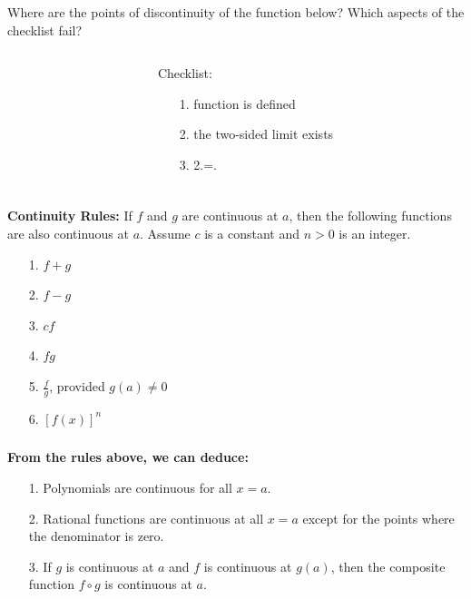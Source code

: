 \documentclass[14pt]{beamer}
\begin{document}
\begin{frame}
\small
Where are the points of discontinuity of the function below?  Which aspects of the checklist fail?
\begin{columns}[T]
	\begin{column}{.45\textwidth}
		\begin{block}
		\end{block}
	\end{column}
	\begin{column}{.45\textwidth}
		\begin{block}
		{Checklist:}
			\begin{itemize}
			\item[1.] function is defined
			\item[2.] the two-sided limit exists
			\item[3.] 2.\;=\;1.
			\end{itemize}
		\end{block}
	\end{column}
\end{columns}
\end{frame}

\begin{frame}
\frametitle{}
\small
{\bf Continuity Rules:}  If $f$ and $g$ are continuous at $a$, then the following functions are also continuous at $a$.  Assume $c$ is a constant and $n>0$ is an integer.

\begin{itemize}
\item[1.] $f+g$
\item[2.] $f-g$
\item[3.] $cf$
\item[4.] $fg$
\item[5.] $\frac{f}{g}$, provided $g(a)\ne 0$
\item[6.] $[f(x)]^n$
\end{itemize}
\end{frame}

\begin{frame}
\frametitle{}
{\bf From the rules above, we can deduce:}

\begin{itemize}
\item[1.] Polynomials are continuous for all $x=a$.
\item[2.] Rational functions are continuous at all $x=a$ except for the points where the denominator is zero.  
\item[3.] If $g$ is continuous at $a$ and $f$ is continuous at $g(a)$, then the composite function $f \circ g$ is continuous at $a$.
\end{itemize}
\end{frame}
\end{document}
